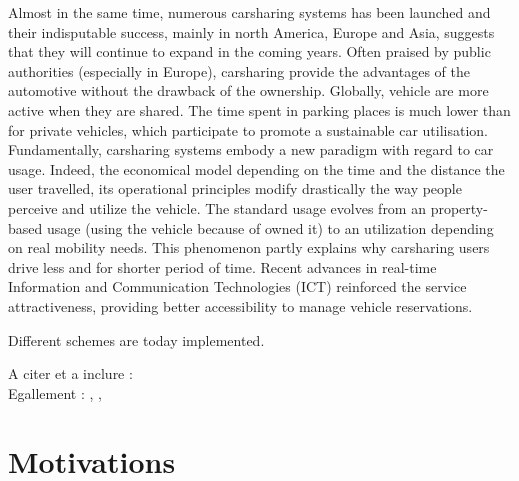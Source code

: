 \begin{bibunit}[ieeetr]
Almost in the same time, numerous carsharing systems has been launched and their indisputable success, mainly in north America, Europe and Asia, suggests that they will continue to expand in the coming years.
Often praised by public authorities (especially in Europe), carsharing provide the advantages of the automotive without the drawback of the ownership.
Globally, vehicle are more active when they are shared.
The time spent in parking places is much lower than for private vehicles, which participate to promote a sustainable car utilisation.
Fundamentally, carsharing systems embody a new paradigm with regard to car usage.
Indeed, the economical model depending on the time and the distance the user travelled, its operational principles modify drastically the way people perceive and utilize the vehicle.
The standard usage evolves from an property-based usage (\ie using the vehicle because of owned it) to an utilization depending on real mobility needs.
This phenomenon partly explains why carsharing users drive less and for shorter period of time.
Recent advances in real-time Information and Communication Technologies (ICT) reinforced the service attractiveness, providing better accessibility to manage vehicle reservations.


\medskip %
Different schemes are today implemented.



A citer et a inclure : \cite{le_vine_carsharing_2014}\\
Egallement : \cite{v-traffic_letat_2014}, \cite{la_mobilite_2008}, 






\section{Motivations}

\end{bibunit}
